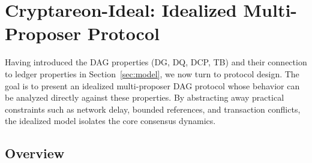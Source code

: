 
\section{Cryptareon-Ideal: Idealized Multi-Proposer Protocol}
\label{sec:ideal}
Having introduced the DAG properties (DG, DQ, DCP, TB) and their connection to ledger properties in Section~\ref{sec:model}, we now turn to protocol design. The goal is to present an idealized multi-proposer DAG protocol whose behavior can be analyzed directly against these properties. By abstracting away practical constraints such as network delay, bounded references, and transaction conflicts, the idealized model isolates the core consensus dynamics. 

\subsection{Overview}
